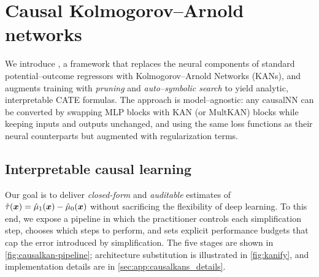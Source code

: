 \section{Causal Kolmogorov--Arnold networks}
\label{sec:causalkans}

We introduce \emph{\ours}, a framework that replaces the neural components of standard potential–outcome regressors with Kolmogorov--Arnold Networks (KANs), and augments training with \emph{pruning} and \emph{auto–symbolic search} to yield analytic, interpretable CATE formulas. The approach is model–agnostic: any causalNN can be converted by swapping MLP blocks with KAN (or MultKAN) blocks while keeping inputs and outputs unchanged, and using the same loss functions as their neural counterparts but augmented with  regularization terms.

\subsection{Interpretable causal learning}
\label{sec:pipeline}

Our goal is to deliver \emph{closed-form} and \emph{auditable} estimates of $\hat{\tau}({\bm{x}})=\hat{\mu}_1({\bm{x}})-\hat{\mu}_0({\bm{x}})$ without sacrificing the flexibility of deep learning. To this end, we expose a pipeline in which the practitioner controls each simplification step, chooses which steps to perform, and sets explicit performance budgets that cap the error introduced by simplification. The five stages are shown in \cref{fig:causalkan-pipeline}; architecture substitution is illustrated in \cref{fig:kanify}, and implementation details are in \cref{sec:app:causalkans_details}.

